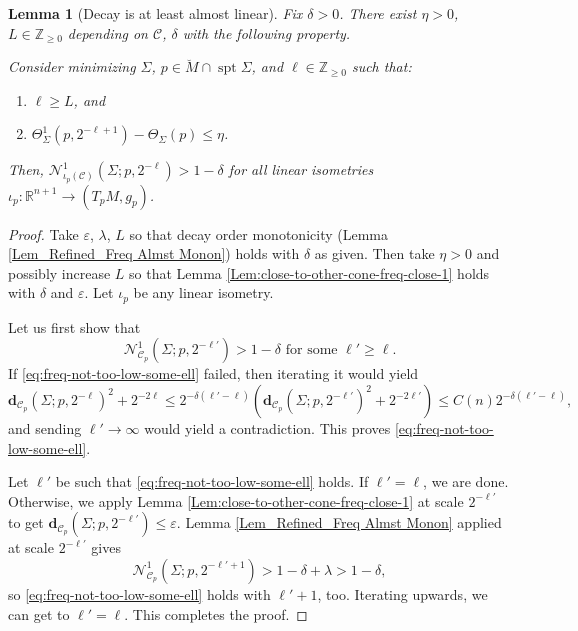 \documentclass[11pt, letterpaper, reqno]{amsart}
\numberwithin{equation}{section}
\newtheorem{Lem}[Def]{Lemma}
\theoremstyle{remark}
\newcommand{\RR}{\mathbb{R}}
\newcommand{\ZZ}{\mathbb{Z}}
\newcommand{\cC}{\mathcal{C}}
\newcommand{\cN}{\mathcal{N}}
\newcommand{\mbfd}{\mathbf{d}}
\newcommand{\spt}{\operatorname{spt}}
\newcommand{\eps}{\varepsilon}
\begin{document}
\begin{Lem}[Decay is at least almost linear]\label{Lem:freq-not-too-low}  
Fix $\delta > 0$. There exist $\eta > 0$, $L \in \ZZ_{\geq 0}$ depending on $\cC$, $\delta$ with the following property.

Consider minimizing $\Sigma$, $p \in \breve M \cap \spt \Sigma$, and $\ell \in \ZZ_{\geq 0}$ such that:
\begin{enumerate}
\item $\ell \geq L$, and
\item  $\Theta^{1}_{\Sigma}(p,2^{-\ell+1}) - \Theta_\Sigma(p) \leq \eta$.
\end{enumerate}
Then, $\cN^{1}_{\iota_p(\cC)}(\Sigma;p,2^{-\ell}) > 1-\delta$ for all linear isometries $\iota_p : \RR^{n+1} \to (T_p M, g_p)$.
\end{Lem}
\begin{proof}
Take $\eps$, $\lambda$, $L$ so that decay order monotonicity (Lemma \ref{Lem_Refined_Freq Almst Monon}) holds with $\delta$ as given. Then take $\eta > 0$ and possibly increase $L$ so that Lemma \ref{Lem:close-to-other-cone-freq-close-1} holds with $\delta$ and $\eps$. Let $\iota_p$ be any linear isometry.

Let us first show that 
\begin{equation} \label{eq:freq-not-too-low-some-ell}
	\cN^{1}_{\cC_p}(\Sigma; p, 2^{-\ell'}) > 1-\delta \text{ for some } \ell' \geq \ell.
\end{equation}
If \eqref{eq:freq-not-too-low-some-ell} failed, then iterating it would yield
\[
\mbfd_{\cC_p}(\Sigma;p,2^{-\ell})^2 + 2^{-2\ell} \leq 2^{-\delta(\ell'-\ell)}(\mbfd_{\cC_p}(\Sigma;p,2^{-\ell'})^2 + 2^{-2\ell'}) \leq C(n) 2^{-\delta(\ell'-\ell)},
\]
and sending $\ell'\to\infty$ would yield a contradiction. This proves \eqref{eq:freq-not-too-low-some-ell}.

Let $\ell'$ be such that \eqref{eq:freq-not-too-low-some-ell} holds. If $\ell' = \ell$, we are done. Otherwise, we apply Lemma \ref{Lem:close-to-other-cone-freq-close-1} at scale $2^{-\ell'}$ to get $\mbfd_{\cC_p}(\Sigma;p,2^{-\ell'}) \leq \eps$. Lemma \ref{Lem_Refined_Freq Almst Monon} applied at scale $2^{-\ell'}$ gives
\[ \cN^{1}_{\cC_p}(\Sigma;p,2^{-\ell'+1}) > 1- \delta + \lambda > 1-\delta, \]
so \eqref{eq:freq-not-too-low-some-ell} holds with $\ell'+1$, too. Iterating upwards, we can get to $\ell' = \ell$. This completes the proof.
\end{proof}
\end{document}
